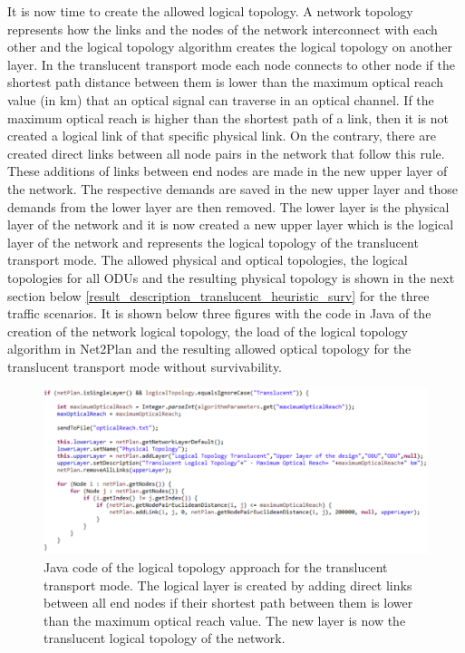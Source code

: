 \vspace{11pt}
It is now time to create the allowed logical topology. A network topology represents how the links and the nodes of the network interconnect with each other and the logical topology algorithm creates the logical topology on another layer. In the translucent transport mode each node connects to other node if the shortest path distance between them is lower than the maximum optical reach value (in km) that an optical signal can traverse in an optical channel. If the maximum optical reach is higher than the shortest path of a link, then it is not created a logical link of that specific physical link. On the contrary, there are created direct links between all node pairs in the network that follow this rule. These additions of links between end nodes are made in the new upper layer of the network. The respective demands are saved in the new upper layer and those demands from the lower layer are then removed. The lower layer is the physical layer of the network and it is now created a new upper layer which is the logical layer of the network and represents the logical topology of the translucent transport mode.
The allowed physical and optical topologies, the logical topologies for all ODUs and the resulting physical topology is shown in the next section below \ref{result_description_translucent_heuristic_surv} for the three traffic scenarios. It is shown below three figures with the code in Java of the creation of the network logical topology, the load of the logical topology algorithm in Net2Plan and the resulting allowed optical topology for the translucent transport mode without survivability.

\begin{figure}[H]
\centering
\includegraphics[width=15cm]{sdf/heuristic/translucent_survivability/figures/logical_topology_creation_translucent}
\caption{Java code of the logical topology approach for the translucent transport mode. The logical layer is created by adding direct links between all end nodes if their shortest path between them is lower than the maximum optical reach value. The new layer is now the translucent logical topology of the network.}
\label{logical_topology_creation_translucent}
\end{figure}

